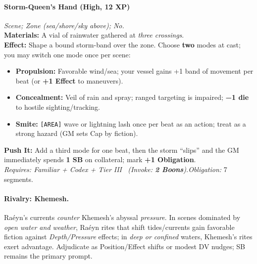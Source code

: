 \paragraph{Storm-Queen’s Hand (High, 12 XP)} \emph{Scene; Zone (sea/shore/sky above); No.}\\
\textbf{Materials:} A vial of rainwater gathered at \emph{three crossings}.\\
\textbf{Effect:} Shape a bound storm-band over the zone. Choose \textbf{two} modes at cast; you may switch one mode once per scene:
\begin{itemize}
  \item \textbf{Propulsion:} Favorable wind/sea; your vessel gains +1 band of movement per beat (or \textbf{+1 Effect} to maneuvers).
  \item \textbf{Concealment:} Veil of rain and spray; ranged targeting is impaired; \textbf{−1 die} to hostile sighting/tracking.
  \item \textbf{Smite:} \texttt{[AREA]} wave or lightning lash once per beat as an action; treat as a strong hazard (GM sets Cap by fiction).
\end{itemize}
\textbf{Push It:} Add a third mode for one beat, then the storm “slips” and the GM immediately spends \textbf{1 SB} on collateral; mark \textbf{+1 Obligation}.\\
\emph{Requires: Familiar + Codex + Tier III \ (\textit{Invoke:} \textbf{2 Boons}).}\quad \emph{Obligation:} 7 segments.

\paragraph{Rivalry: Khemesh.} Raéyn’s currents \emph{counter} Khemesh’s abyssal \emph{pressure}. In scenes dominated by \emph{open water and weather}, Raéyn rites that shift tides/currents gain favorable fiction against \emph{Depth/Pressure} effects; in \emph{deep or confined} waters, Khemesh’s rites exert advantage. Adjudicate as Position/Effect shifts or modest DV nudges; SB remains the primary prompt.
